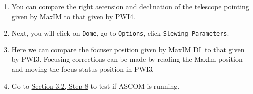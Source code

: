 \documentclass{article}
\begin{document}
\begin{enumerate}
		\item You can compare the right ascension and declination of the telescope pointing given by MaxIM to that given by PWI4. 
		
		\item Next, you will click on \texttt{Dome}, go to \texttt{Options}, click \texttt{Slewing Parameters}.
		
		\item Here we can compare the focuser position given by MaxIM DL to that given by PWI3. Focusing corrections can be made by reading the MaxIm position and moving the focus status position in PWI3.
		
		\item Go to \hyperref[sec:take-test-exposure]{Section 3.2, Step 8} to test if ASCOM is running. 
		
	\end{enumerate}	
	
\end{document}
